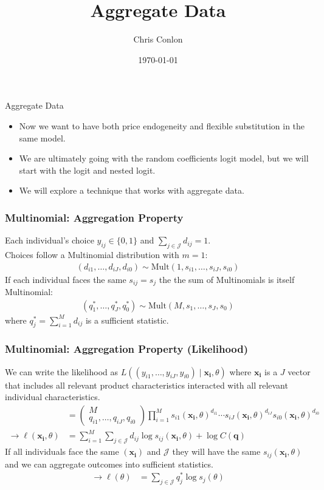 \documentclass[xcolor=pdftex,dvipsnames,table,mathserif,aspectratio=169]{beamer}
\begin{document}
\title{Aggregate Data}
\author{Chris Conlon}
\date{\today}

\frame{\titlepage}

\begin{frame}{Aggregate Data}
 \begin{itemize}
\item Now we want to have both \alert{price endogeneity} and \alert{flexible substitution} in the same model.
\item We are ultimately going with the random coefficients logit model, but we will start with the logit and nested logit.
\item We will explore a technique that works with \alert{aggregate data}.
 \end{itemize}
\end{frame}



\begin{frame}
\frametitle{Multinomial:  Aggregation Property}
Each individual's choice $y_{ij} \in\{0,1\}$ and $\sum_{j \in \mathcal{J}} d_{ij} =1$.\\

Choices follow a Multinomial distribution with $m=1$:
\begin{align*}
(d_{i1},\ldots,d_{iJ},d_{i0}) \sim \text{Mult} (1,s_{i1},\ldots,s_{iJ},s_{i0} ) 
\end{align*}
If each individual faces the same $s_{ij}=s_j$ the the sum of Multinomials is itself Multinomial:
\begin{align*}
(q_{1}^{*},\ldots,q_{J}^{*},q_{0}^{*}) \sim \text{Mult} (M, s_{1},\ldots,s_{J},s_{0} ) 
\end{align*}
where $q_{j}^{*}=\sum_{i=1}^M d_{ij}$ is a \alert{sufficient statistic}.
\end{frame}

\begin{frame}
\frametitle{Multinomial:  Aggregation Property (Likelihood)}
We can write the likelihood as $L\left((y_{i1},\ldots,y_{iJ},y_{i0})  \mid \mathbf{x_i},  \theta \right)$ where $\mathbf{x_i}$ is a $J$ vector that includes all relevant product characteristics interacted with all relevant individual characteristics.
\begin{align*}
&=
\left(\begin{array}{c}
M \\
q_{i1},\ldots, q_{iJ}, q_{i0}
\end{array}\right)
\prod_{i=1}^M s_{i1}(\mathbf{x_i},\theta)^{d_{i1}}\cdots s_{iJ}(\mathbf{x_i},\theta)^{d_{iJ}}  s_{i0}(\mathbf{x_i},\theta)^{d_{i0}}\\
\rightarrow \ell(\mathbf{x_i},\theta)&= \sum_{i=1}^M \sum_{j \in \mathcal{J}} d_{ij} \log s_{ij}(\mathbf{x_i},\theta) + \log C(\mathbf{q})
\end{align*}
If all individuals face the same $(\mathbf{x_i})$ and $\mathcal{J}$ they will have the same $s_{ij}(\mathbf{x_i},\theta)$ and we can aggregate outcomes into \alert{sufficient statistics}.
\begin{align*}
\rightarrow \ell(\theta) &=  \sum_{j \in \mathcal{J}} q_{j}^{*} \log s_{j}(\theta)
\end{align*}
\end{frame}
\end{document}
